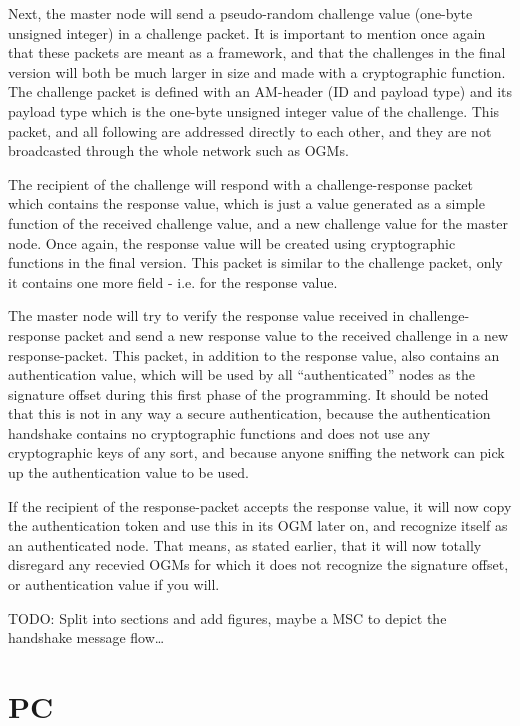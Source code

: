 Next, the master node will send a pseudo-random challenge value (one-byte
unsigned integer) in a challenge packet. It is important to mention once
again that these packets are meant as a framework, and that the challenges in
the final version will both be much larger in size and made with a
cryptographic function. The challenge packet is defined with an \ac{AM}-header
(ID and payload type) and its payload type which is the one-byte unsigned
integer value of the challenge. This packet, and all following are addressed
directly to each other, and they are not broadcasted through the whole network
such as \acp{OGM}.

The recipient of the challenge will respond with a challenge-response packet
which contains the response value, which is just a value generated as a simple
function of the received challenge value, and a new challenge value for the
master node. Once again, the response value will be created using
cryptographic functions in the final version. This packet is similar to the
challenge packet, only it contains one more field - i.e. for the response value.

The master node will try to verify the response value received in
challenge-response packet and send a new response value to the received
challenge in a new response-packet. This packet, in addition to the response
value, also contains an authentication value, which will be used by all
``authenticated'' nodes as the signature offset during this first phase of the
programming. It should be noted that this is not in any way a secure
authentication, because the authentication handshake contains no cryptographic
functions and does not use any cryptographic keys of any sort, and because
anyone sniffing the network can pick up the authentication value to be used.

If the recipient of the response-packet accepts the response value, it will now
copy the authentication token and use this in its \ac{OGM} later on, and
recognize itself as an authenticated node. That means, as stated earlier, that
it will now totally disregard any recevied \acp{OGM} for which it does not
recognize the signature offset, or authentication value if you will.

TODO: Split into sections and add figures, maybe a MSC to depict the handshake
message flow\ldots

\section{\acf{PC}}

